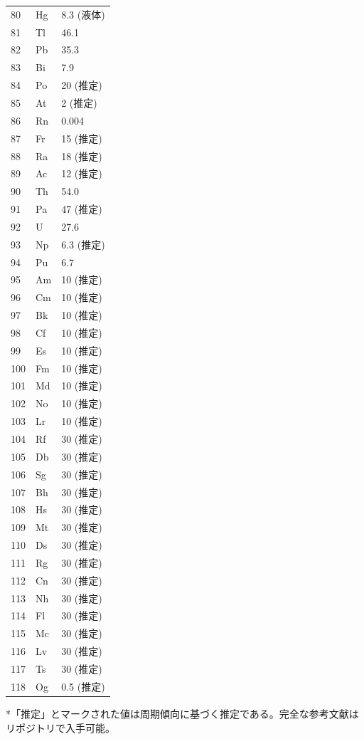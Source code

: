 \documentclass[11pt,a4paper]{article}
\theoremstyle{remark}
\begin{document}
\begin{longtable}{p{0.6cm}p{1.2cm}p{1.5cm}}
		80 & Hg & 8.3 (液体) \\
		81 & Tl & 46.1 \\
		82 & Pb & 35.3 \\
		83 & Bi & 7.9 \\
		84 & Po & 20 (推定) \\
		85 & At & 2 (推定) \\
		86 & Rn & 0.004 \\
		87 & Fr & 15 (推定) \\
		88 & Ra & 18 (推定) \\
		89 & Ac & 12 (推定) \\
		90 & Th & 54.0 \\
		91 & Pa & 47 (推定) \\
		92 & U  & 27.6 \\
		93 & Np & 6.3 (推定) \\
		94 & Pu & 6.7 \\
		95 & Am & 10 (推定) \\
		96 & Cm & 10 (推定) \\
		97 & Bk & 10 (推定) \\
		98 & Cf & 10 (推定) \\
		99 & Es & 10 (推定) \\
		100& Fm & 10 (推定) \\
		101& Md & 10 (推定) \\
		102& No & 10 (推定) \\
		103& Lr & 10 (推定) \\
		104& Rf & 30 (推定) \\
		105& Db & 30 (推定) \\
		106& Sg & 30 (推定) \\
		107& Bh & 30 (推定) \\
		108& Hs & 30 (推定) \\
		109& Mt & 30 (推定) \\
		110& Ds & 30 (推定) \\
		111& Rg & 30 (推定) \\
		112& Cn & 30 (推定) \\
		113& Nh & 30 (推定) \\
		114& Fl & 30 (推定) \\
		115& Mc & 30 (推定) \\
		116& Lv & 30 (推定) \\
		117& Ts & 30 (推定) \\
		118& Og & 0.5 (推定) \\
		\bottomrule
	\end{longtable}
	*「推定」とマークされた値は周期傾向に基づく推定である。完全な参考文献はリポジトリで入手可能。
	
\end{document}
